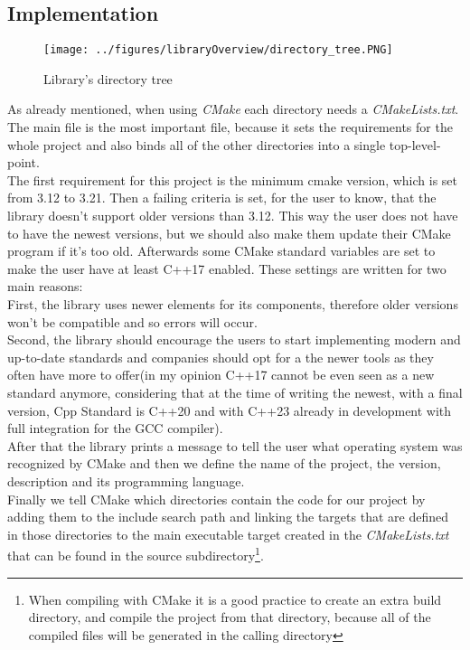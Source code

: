\subsection{Implementation}
\begin{wrapfigure}{1}{0.5\textwidth}
	\texttt{[image: ../figures/libraryOverview/directory\_tree.PNG]}
	\caption{Library's directory tree}
	\label{directory_tree}
\end{wrapfigure}
As already mentioned, when using \textit{CMake} each directory needs a \textit{CMakeLists.txt}. The main file is the most important file, because it sets the requirements for the whole project and also binds all of the other directories into a single top-level-point.\\
The first requirement for this project is the minimum cmake version, which is set from 3.12 to 3.21. Then a failing criteria is set, for the user to know, that the library doesn't support older versions than 3.12. This way the user does not have to have the newest versions, but we should also make them update their CMake program if it's too old. Afterwards some CMake standard variables are set to make the user have at least C++17 enabled. These settings are written for two main reasons: \\
First, the library uses newer elements for its components, therefore older versions won't be compatible and so errors will occur.\\
Second, the library should encourage the users to start implementing modern and up-to-date standards and companies should opt for a the newer tools as they often have more to offer(in my opinion C++17 cannot be even seen as a new standard anymore, considering that at the time of writing the newest, with a final version, Cpp Standard is C++20 and with C++23 already in development with full integration for the GCC compiler).\\
After that the library prints a message to tell the user what operating system was recognized by CMake and then we define the name of the project, the version, description and its programming language.\\
Finally we tell CMake which directories contain the code for our project by adding them to the include search path and linking the targets that are defined in those directories to the main executable target created in the \textit{CMakeLists.txt} that can be found in the source subdirectory\footnote{When compiling with CMake it is a good practice to create an extra build directory, and compile the project from that directory, because all of the compiled files will be generated in the calling directory}.\\ 
